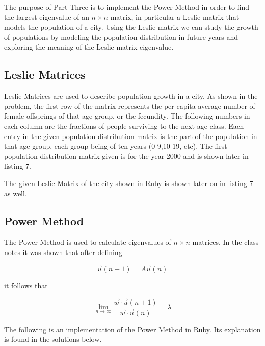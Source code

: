 \documentclass[letterpaper,12pt]{article}
\begin{document}

The purpose of Part Three is to implement the Power Method in order to find the
largest eigenvalue of an $n \times n$ matrix, in particular a Leslie matrix that
models the population of a city. Using the Leslie matrix we can study the growth of populations by modeling the population distribution in future years and exploring the meaning of the Leslie matrix eigenvalue.

\subsection{Leslie Matrices}

Leslie Matrices are used to describe population growth in a city.
As shown in the problem, the first row of the matrix represents the per capita
average number of female offsprings of that age group, or the fecundity.
The following numbers in each column are the fractions of people surviving to the
next age class.
Each entry in the given population distribution matrix is the part of the
population in that age group, each group being of ten years (0-9,10-19, etc).
The first population distribution matrix given is for the year 2000 and is shown
later in listing 7.

The given Leslie Matrix of the city shown in Ruby is shown later on in listing 7 as well.

\subsection{Power Method}

The Power Method is used to calculate eigenvalues of $n \times n$ matrices.
In the class notes it was shown that after defining 

\[\vec{u}(n+1) = A\vec{u}(n)\]

it follows that

\[\lim_{n\to\infty} \frac{{\vec{w}} \cdot {\vec{u}(n+1)}}{ {\vec{w}} \cdot {\vec{u}(n)}} =\lambda\]

The following is an implementation of the Power Method in Ruby.
Its explanation is found in the solutions below.
\end{document}
